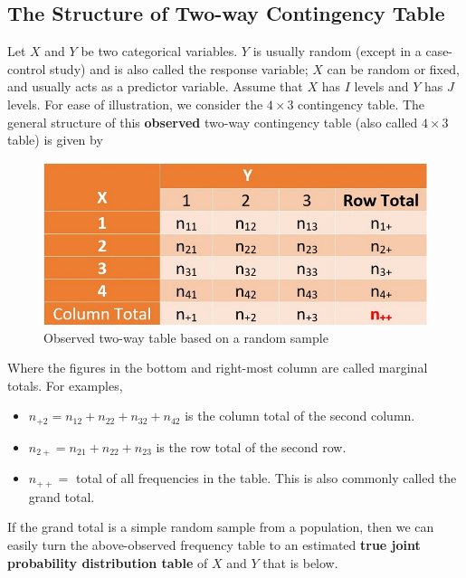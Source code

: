 \documentclass[
]{book}
\begin{document}
\hypertarget{the-structure-of-two-way-contingency-table}{%
\subsection{The Structure of Two-way Contingency Table}\label{the-structure-of-two-way-contingency-table}}

Let \(X\) and \(Y\) be two categorical variables. \(Y\) is usually random (except in a case-control study) and is also called the response variable; \(X\) can be random or fixed, and usually acts as a predictor variable. Assume that \(X\) has \(I\) levels and \(Y\) has \(J\) levels. For ease of illustration, we consider the \(4\times3\) contingency table. The general structure of this \textbf{observed} two-way contingency table (also called \(4\times3\) table) is given by

\begin{figure}

{\centering \includegraphics[width=0.8\linewidth]{img12/w12-ObservedTable} 

}

\caption{Observed two-way table based on a random sample}\label{fig:unnamed-chunk-190}
\end{figure}

Where the figures in the bottom and right-most column are called marginal totals. For examples,

\begin{itemize}
\item
  \(n_{+ 2} = n_{12} + n_{22} + n_{32} + n_{42}\) is the column total of the second column.
\item
  \(n_{2+} = n_{21} + n_{22} + n_{23}\) is the row total of the second row.
\item
  \(n_{++} =\) total of all frequencies in the table. This is also commonly called the grand total.
\end{itemize}

If the grand total is a simple random sample from a population, then we can easily turn the above-observed frequency table to an estimated \textbf{true joint probability distribution table} of \(X\) and \(Y\) that is below.
\end{document}

